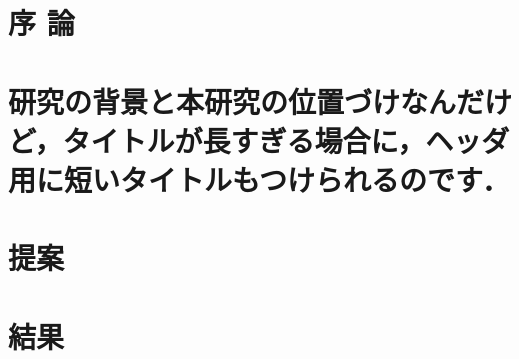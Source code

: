 \documentclass{thesis}
\begin{document}
\makethesistitle

\frontmatter
\tableofcontents
\thispagestyle{front} 
\clearpage
\listoffigures  %
\thispagestyle{front} 
\clearpage
\listoftables  %
\thispagestyle{front} 
\clearpage

\mainmatter


\chapter{序  論}
\label{chapter:序論}



\chapter[ヘッダ用の短いタイトル]{研究の背景と本研究の位置づけなんだけど，タイトルが長すぎる場合に，ヘッダ用に短いタイトルもつけられるのです．}
\label{chapter:研究の背景と本研究の位置づけ}



\chapter{提案}
\label{chapter:（提案）}



\chapter{結果}
\label{chapter:結果}


\end{document}
